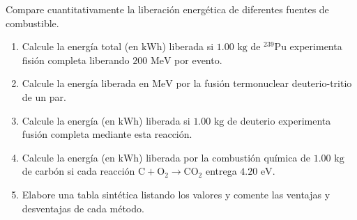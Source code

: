 \item Compare cuantitativamente la liberación energética de diferentes fuentes de combustible.
\begin{enumerate}
    \item Calcule la energía total (en $\text{kWh}$) liberada si $1.00\text{ kg}$ de $^{239}\text{Pu}$ experimenta fisión completa liberando $200\text{ MeV}$ por evento.
    \item Calcule la energía liberada en $\text{MeV}$ por la fusión termonuclear deuterio-tritio de un par.
    \item Calcule la energía (en $\text{kWh}$) liberada si $1.00\text{ kg}$ de deuterio experimenta fusión completa mediante esta reacción.
    \item Calcule la energía (en $\text{kWh}$) liberada por la combustión química de $1.00\text{ kg}$ de carbón si cada reacción $\text{C} + \text{O}_2 \to \text{CO}_2$ entrega $4.20\text{ eV}$.
    \item Elabore una tabla sintética listando los valores y comente las ventajas y desventajas de cada método.
\end{enumerate}